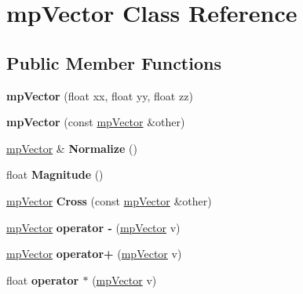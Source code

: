 \hypertarget{classmp_vector}{}\section{mp\+Vector Class Reference}
\label{classmp_vector}
\subsection*{Public Member Functions}
\begin{DoxyCompactItemize}
\item 
\mbox{\label{classmp_vector_ae07ae7178f98650af16bb145c91d0427}} 
{\bfseries mp\+Vector} (float xx, float yy, float zz)
\item 
\mbox{\label{classmp_vector_a9dc32e970b53fae22df231b904e8fa48}} 
{\bfseries mp\+Vector} (const \mbox{\hyperlink{classmp_vector}{mp\+Vector}} \&other)
\item 
\mbox{\label{classmp_vector_ada41cb07f004dc5e7e65d25da132ea45}} 
\mbox{\hyperlink{classmp_vector}{mp\+Vector}} \& {\bfseries Normalize} ()
\item 
\mbox{\label{classmp_vector_ac27decfbc97c67c8f38e467a35b05351}} 
float {\bfseries Magnitude} ()
\item 
\mbox{\label{classmp_vector_a583cd6e4817a11201cd0cc275f02a6cb}} 
\mbox{\hyperlink{classmp_vector}{mp\+Vector}} {\bfseries Cross} (const \mbox{\hyperlink{classmp_vector}{mp\+Vector}} \&other)
\item 
\mbox{\label{classmp_vector_a0c9beb622d7b1056c139450a46a54820}} 
\mbox{\hyperlink{classmp_vector}{mp\+Vector}} {\bfseries operator -\/} (\mbox{\hyperlink{classmp_vector}{mp\+Vector}} v)
\item 
\mbox{\label{classmp_vector_ad9099f2896a3fb746c4e99ad6ef00cab}} 
\mbox{\hyperlink{classmp_vector}{mp\+Vector}} {\bfseries operator+} (\mbox{\hyperlink{classmp_vector}{mp\+Vector}} v)
\item 
\mbox{\label{classmp_vector_ae9357849a987bcd071ce0e347ba23efd}} 
float {\bfseries operator $\ast$} (\mbox{\hyperlink{classmp_vector}{mp\+Vector}} v)

\end{DoxyCompactItemize}
